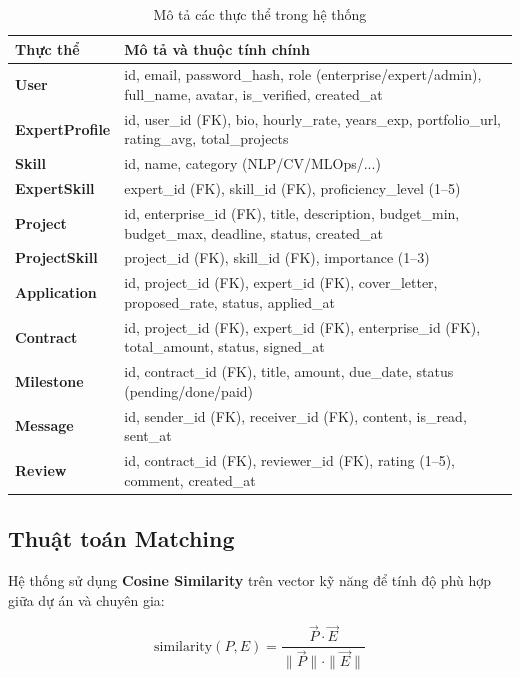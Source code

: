 \begin{table}[H]
\centering
\caption{Mô tả các thực thể trong hệ thống}
\begin{tabular}{p{3cm} p{10cm}}
\toprule
\textbf{Thực thể} & \textbf{Mô tả và thuộc tính chính} \\
\midrule
\textbf{User}
  & id, email, password\_hash, role (enterprise/expert/admin),
    full\_name, avatar, is\_verified, created\_at \\
\midrule
\textbf{ExpertProfile}
  & id, user\_id (FK), bio, hourly\_rate, years\_exp,
    portfolio\_url, rating\_avg, total\_projects \\
\midrule
\textbf{Skill}
  & id, name, category (NLP/CV/MLOps/...) \\
\midrule
\textbf{ExpertSkill}
  & expert\_id (FK), skill\_id (FK), proficiency\_level (1--5) \\
\midrule
\textbf{Project}
  & id, enterprise\_id (FK), title, description, budget\_min,
    budget\_max, deadline, status, created\_at \\
\midrule
\textbf{ProjectSkill}
  & project\_id (FK), skill\_id (FK), importance (1--3) \\
\midrule
\textbf{Application}
  & id, project\_id (FK), expert\_id (FK), cover\_letter,
    proposed\_rate, status, applied\_at \\
\midrule
\textbf{Contract}
  & id, project\_id (FK), expert\_id (FK), enterprise\_id (FK),
    total\_amount, status, signed\_at \\
\midrule
\textbf{Milestone}
  & id, contract\_id (FK), title, amount, due\_date,
    status (pending/done/paid) \\
\midrule
\textbf{Message}
  & id, sender\_id (FK), receiver\_id (FK), content,
    is\_read, sent\_at \\
\midrule
\textbf{Review}
  & id, contract\_id (FK), reviewer\_id (FK), rating (1--5),
    comment, created\_at \\
\bottomrule
\end{tabular}
\end{table}

\subsection{Thuật toán Matching}

Hệ thống sử dụng \textbf{Cosine Similarity} trên vector kỹ năng để
tính độ phù hợp giữa dự án và chuyên gia:

\begin{equation}
  \text{similarity}(P, E) =
  \frac{\vec{P} \cdot \vec{E}}{\|\vec{P}\| \cdot \|\vec{E}\|}
  \label{eq:cosine}
\end{equation}

